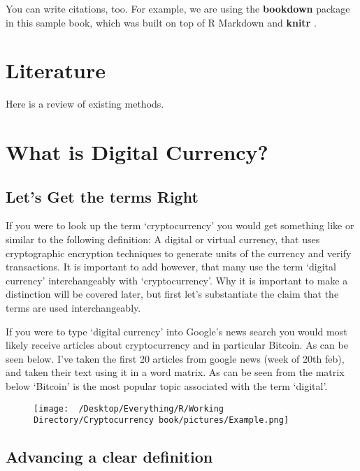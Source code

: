 \documentclass[]{book}
\theoremstyle{definition}
\theoremstyle{definition}
\theoremstyle{definition}
\theoremstyle{remark}
\begin{document}
You can write citations, too. For example, we are using the
\textbf{bookdown} package \citep{R-bookdown} in this sample book, which
was built on top of R Markdown and \textbf{knitr} \citep{xie2015}.

\chapter{Literature}\label{literature}

Here is a review of existing methods.

\chapter{What is Digital Currency?}\label{what-is-digital-currency}

\section{Let's Get the terms Right}\label{lets-get-the-terms-right}

If you were to look up the term `cryptocurrency' you would get something
like or similar to the following definition: A digital or virtual
currency, that uses cryptographic encryption techniques to generate
units of the currency and verify transactions. It is important to add
however, that many use the term `digital currency' interchangeably with
`cryptocurrency'. Why it is important to make a distinction will be
covered later, but first let's substantiate the claim that the terms are
used interchangeably.

If you were to type `digital currency' into Google's news search you
would most likely receive articles about cryptocurrency and in
particular Bitcoin. As can be seen below. I've taken the first 20
articles from google news (week of 20th feb), and taken their text using
it in a word matrix. As can be seen from the matrix below `Bitcoin' is
the most popular topic associated with the term `digital'.

\begin{figure}[htbp]
\centering
\texttt{[image: ~/Desktop/Everything/R/Working Directory/Cryptocurrency book/pictures/Example.png]}
\caption{}
\end{figure}

\section{Advancing a clear
definition}\label{advancing-a-clear-definition}
\end{document}
